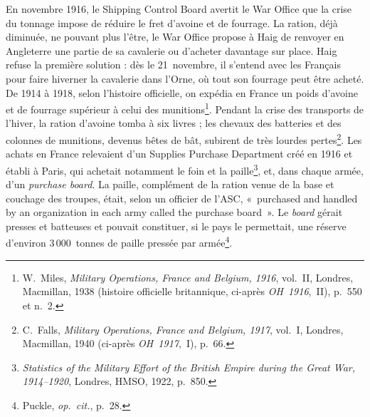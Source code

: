 En novembre 1916, le Shipping Control Board avertit le War Office que la crise du tonnage impose de réduire le fret d'avoine et de fourrage. La ration, déjà diminuée, ne pouvant plus l'être, le War Office propose à Haig de renvoyer en Angleterre une partie de sa cavalerie ou d'acheter davantage sur place. Haig refuse la première solution : dès le 21~novembre, il s'entend avec les Français pour faire hiverner la cavalerie dans l'Orne, où tout son fourrage peut être acheté. De 1914 à 1918, selon l'histoire officielle, on expédia en France un poids d'avoine et de fourrage supérieur à celui des munitions\footnote{W.~Miles, \textit{Military Operations, France and Belgium, 1916}, vol.~II, Londres, Macmillan, 1938 (histoire officielle britannique, ci-après \textit{OH~1916},~II), p.~550 et n.~2.}. Pendant la crise des transports de l'hiver, la ration d'avoine tomba à six livres ; les chevaux des batteries et des colonnes de munitions, devenus bêtes de bât, subirent de très lourdes pertes\footnote{C.~Falls, \textit{Military Operations, France and Belgium, 1917}, vol.~I, Londres, Macmillan, 1940 (ci-après \textit{OH~1917},~I), p.~66.}. Les achats en France relevaient d'un Supplies Purchase Department créé en 1916 et établi à Paris, qui achetait notamment le foin et la paille\footnote{\textit{Statistics of the Military Effort of the British Empire during the Great War, 1914--1920}, Londres, HMSO, 1922, p.~850.}, et, dans chaque armée, d'un \textit{purchase board}. La paille, complément de la ration venue de la base et couchage des troupes, était, selon un officier de l'ASC, «~purchased and handled by an organization in each army called the purchase board~». Le \textit{board} gérait presses et batteuses et pouvait constituer, si le pays le permettait, une réserve d'environ 3\,000~tonnes de paille pressée par armée\footnote{Puckle, \textit{op.~cit.}, p.~28.}.

